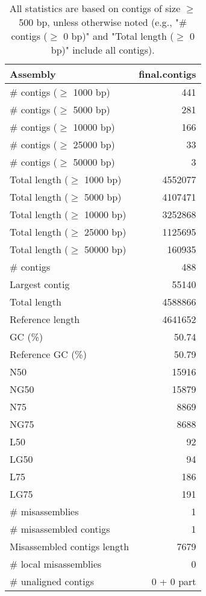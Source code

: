 \documentclass[12pt,a4paper]{article}
\begin{document}
\begin{table}[ht]
\begin{center}
\caption{All statistics are based on contigs of size $\geq$ 500 bp, unless otherwise noted (e.g., "\# contigs ($\geq$ 0 bp)" and "Total length ($\geq$ 0 bp)" include all contigs).}
\begin{tabular}{|l*{1}{|r}|}
\hline
Assembly & final.contigs \\ \hline
\# contigs ($\geq$ 1000 bp) & 441 \\ \hline
\# contigs ($\geq$ 5000 bp) & 281 \\ \hline
\# contigs ($\geq$ 10000 bp) & 166 \\ \hline
\# contigs ($\geq$ 25000 bp) & 33 \\ \hline
\# contigs ($\geq$ 50000 bp) & 3 \\ \hline
Total length ($\geq$ 1000 bp) & 4552077 \\ \hline
Total length ($\geq$ 5000 bp) & 4107471 \\ \hline
Total length ($\geq$ 10000 bp) & 3252868 \\ \hline
Total length ($\geq$ 25000 bp) & 1125695 \\ \hline
Total length ($\geq$ 50000 bp) & 160935 \\ \hline
\# contigs & 488 \\ \hline
Largest contig & 55140 \\ \hline
Total length & 4588866 \\ \hline
Reference length & 4641652 \\ \hline
GC (\%) & 50.74 \\ \hline
Reference GC (\%) & 50.79 \\ \hline
N50 & 15916 \\ \hline
NG50 & 15879 \\ \hline
N75 & 8869 \\ \hline
NG75 & 8688 \\ \hline
L50 & 92 \\ \hline
LG50 & 94 \\ \hline
L75 & 186 \\ \hline
LG75 & 191 \\ \hline
\# misassemblies & 1 \\ \hline
\# misassembled contigs & 1 \\ \hline
Misassembled contigs length & 7679 \\ \hline
\# local misassemblies & 0 \\ \hline
\# unaligned contigs & 0 + 0 part \\ \hline

\end{tabular}
\end{center}
\end{table}
\end{document}
